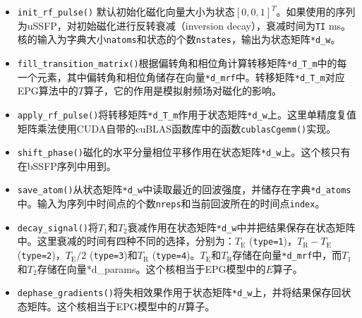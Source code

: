 \begin{itemize}
	\item \texttt{init\_rf\_pulse()} 默认初始化磁化向量大小为状态$[0,0,1]^T$。如果使用的序列为uSSFP，对初始磁化进行反转衰减（inversion decay），衰减时间为\texttt{TI} ms。核的输入为字典大小\texttt{natoms}和状态的个数\texttt{nstates}，输出为状态矩阵\texttt{*d\_w}。 
	
	\item \texttt{fill\_transition\_matrix()}根据偏转角和相位角计算转移矩阵\texttt{*d\_T\_m}中的每一个元素，其中偏转角和相位角储存在向量\texttt{*d\_mrf}中。转移矩阵\texttt{*d\_T\_m}对应EPG算法中的$T$算子，它的作用是模拟射频场对磁化的影响。
	
	\item \texttt{apply\_rf\_pulse()}将转移矩阵\texttt{*d\_T\_m}作用于状态矩阵\texttt{*d\_w}上。这里单精度复值矩阵乘法使用CUDA自带的cuBLAS函数库中的函数\texttt{cublasCgemm()}实现。
	
	\item \texttt{shift\_phase()}磁化的水平分量相位平移作用在状态矩阵\texttt{*d\_w}上。这个核只有在bSSFP序列中用到。
	
	\item \texttt{save\_atom()}从状态矩阵\texttt{*d\_w}中读取最近的回波强度，并储存在字典\texttt{*d\_atoms}中。输入为序列中时间点的个数\texttt{nreps}和当前回波所在的时间点\texttt{index}。
	
	\item \texttt{decay\_signal()}将$T_1$和$T_2$衰减作用在状态矩阵\texttt{*d\_w}中并把结果保存在状态矩阵中。这里衰减的时间有四种不同的选择，分别为：$T_\mathrm{E}$ (\texttt{type=1})，$T_\mathrm{R}-T_\mathrm{E}$ (\texttt{type=2})，$T_\mathrm{E}/2$ (\texttt{type=3})和$T_\mathrm{R}$ (\texttt{type=4})。$T_\mathrm{E}$和$T_\mathrm{R}$存储在向量\texttt{*d\_mrf}中，而$T_1$和$T_2$存储在向量{*d\_params}。这个核相当于EPG模型中的$E$算子。
	
	\item \texttt{dephase\_gradients()}将失相效果作用于状态矩阵\texttt{*d\_w}上，并将结果保存回状态矩阵。这个核相当于EPG模型中的$H$算子。
\end{itemize}

